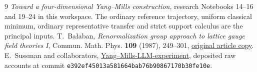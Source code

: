 \documentclass[11pt]{article}
\theoremstyle{remark}
\begin{document}
\begin{thebibliography}{9}
\emph{Toward a four-dimensional Yang--Mills construction},
research Notebooks 14--16 and 19--24 in this workspace.
The ordinary reference trajectory, uniform classical minimum,
ordinary representative transfer and strict support calculus
are the principal inputs.
T.~Ba\l aban,
\emph{Renormalization group approach to lattice gauge field
theories I}, Commun. Math. Phys. \textbf{109} (1987), 249--301,
\href{https://scispace.com/pdf/renormalization-group-approach-to-lattice-gauge-field-3ygai0vxt1.pdf}{original article copy}.
E.~Sussman and collaborators,
\href{https://github.com/ethanwsussman/Yang--Mills-LLM-experiment}{Yang--Mills-LLM-experiment},
deposited raw accounts at commit
\texttt{e392ef4501\allowbreak 3a581664ba\allowbreak b76b908671\allowbreak 70b30fe10e}.
\end{thebibliography}
\end{document}
